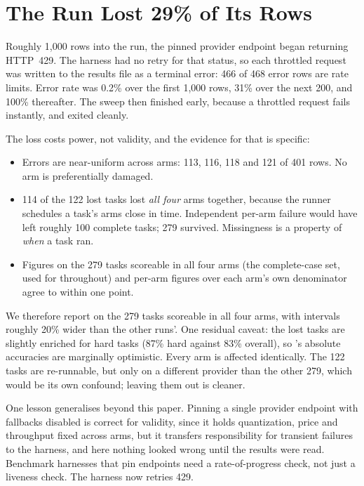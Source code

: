 \section{The \mDS{} Run Lost 29\% of Its Rows}
\label{app:truncation}

Roughly 1{,}000 rows into the \mDS{} run, the pinned provider endpoint
began returning HTTP~429. The harness had no retry for that status, so each
throttled request was written to the results file as a terminal error: 466
of 468 error rows are rate limits. Error rate was 0.2\% over the first
1{,}000 rows, 31\% over the next 200, and 100\% thereafter. The sweep then
finished early, because a throttled request fails instantly, and exited
cleanly.

The loss costs power, not validity, and the evidence for that is specific:

\begin{itemize}
\itemsep2pt
\item Errors are near-uniform across arms: 113, 116, 118 and 121 of 401
      rows. No arm is preferentially damaged.
\item 114 of the 122 lost tasks lost \emph{all four} arms together, because
      the runner schedules a task's arms close in time. Independent per-arm
      failure would have left roughly 100 complete tasks; 279 survived.
      Missingness is a property of \emph{when} a task ran.
\item Figures on the 279 tasks scoreable in all four arms (the
      complete-case set, used for \mDS{} throughout) and per-arm figures
      over each arm's own denominator agree to within one point.
\end{itemize}

We therefore report \mDS{} on the 279 tasks scoreable in all four arms,
with intervals roughly 20\% wider than the other runs'. One residual caveat:
the lost tasks are slightly enriched for hard tasks (87\% hard against 83\%
overall), so \mDS{}'s absolute accuracies are marginally optimistic. Every
arm is affected identically. The 122 tasks are re-runnable, but only on a
different provider than the other 279, which would be its own confound;
leaving them out is cleaner.

One lesson generalises beyond this paper. Pinning a single provider endpoint
with fallbacks disabled is correct for validity, since it holds
quantization, price and throughput fixed across arms, but it transfers
responsibility for transient failures to the harness, and here nothing
looked wrong until the results were read. Benchmark harnesses that pin
endpoints need a rate-of-progress check, not just a liveness check. The
harness now retries 429.
